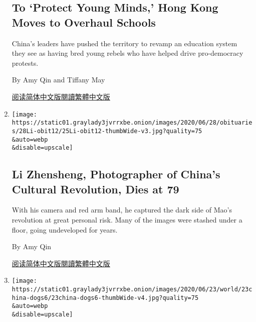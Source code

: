 \begin{enumerate}
  \hypertarget{to-protect-young-minds-hong-kong-moves-to-overhaul-schools}{%
  \subsection{To `Protect Young Minds,' Hong Kong Moves to Overhaul
  Schools}\label{to-protect-young-minds-hong-kong-moves-to-overhaul-schools}}

  China's leaders have pushed the territory to revamp an education
  system they see as having bred young rebels who have helped drive
  pro-democracy protests.

  By Amy Qin and Tiffany May

  \href{https://cn.nytimes3xbfgragh.onion/china/20200713/china-hong-kong-security-schools/}{阅读简体中文版}\href{https://cn.nytimes3xbfgragh.onion/china/20200713/china-hong-kong-security-schools/zh-hant/}{閱讀繁體中文版}
\item
  \href{/2020/06/25/world/asia/li-zhensheng-dead.html}{}

  \texttt{[image: https://static01.graylady3jvrrxbe.onion/images/2020/06/28/obituaries/28Li-obit12/25Li-obit12-thumbWide-v3.jpg?quality=75\\\&auto=webp\\\&disable=upscale]}

  \hypertarget{li-zhensheng-photographer-of-chinas-cultural-revolution-dies-at-79}{%
  \subsection{Li Zhensheng, Photographer of China's Cultural Revolution,
  Dies at
  79}\label{li-zhensheng-photographer-of-chinas-cultural-revolution-dies-at-79}}

  With his camera and red arm band, he captured the dark side of Mao's
  revolution at great personal risk. Many of the images were stashed
  under a floor, going undeveloped for years.

  By Amy Qin

  \href{https://cn.nytimes3xbfgragh.onion/obits/20200629/li-zhensheng-dead/}{阅读简体中文版}\href{https://cn.nytimes3xbfgragh.onion/obits/20200629/li-zhensheng-dead/zh-hant/}{閱讀繁體中文版}
\item
  \href{/2020/06/23/world/asia/china-dog-meat.html}{}

  \texttt{[image: https://static01.graylady3jvrrxbe.onion/images/2020/06/23/world/23china-dogs6/23china-dogs6-thumbWide-v4.jpg?quality=75\\\&auto=webp\\\&disable=upscale]}

  \hypertarget{in-fight-to-ban-dog-meat-chinas-activists-find-an-ally-the-coronavirus}{%
}
\end{enumerate}
